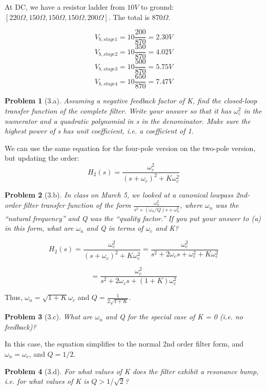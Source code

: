 \documentclass[12pt]{article}
\providecommand{\ohm}[0]{\ensuremath{\Omega}}
\newtheorem*{prob}{Problem}
\begin{document}
At DC, we have a resistor ladder from $10V$ to ground: $[ 220\ohm, 150\ohm, 150\ohm, 150\ohm, 200\ohm ]$. The total is $870\ohm$.

\[ V_{b,stage1} = 10\frac{200}{870} = 2.30V \]
\[ V_{b,stage2} = 10\frac{350}{870} = 4.02V \]
\[ V_{b,stage3} = 10\frac{500}{870} = 5.75V \]
\[ V_{b,stage4} = 10\frac{650}{870} = 7.47V \]


\begin{prob}[3.a]{
Assuming a negative feedback factor of K, find the closed-loop transfer function of the complete filter. Write your answer so that it has $\omega_c^2$ in the numerator and a quadratic polynomial in s in the denominator. Make sure the highest power of s has unit coefficient, i.e. a coefficient of 1.
}\end{prob}
We can use the same equation for the four-pole version on the two-pole version, but updating the order:
\[ H_2(s) = \frac{\omega_c^2}{(s+\omega_c)^2 + K\omega_c^2} \]

\begin{prob}[3.b]{
 In class on March 5, we looked at a canonical lowpass 2nd-order filter transfer function of the form $\frac{\omega_n^2 }{s^2 + (\omega_n / Q) s + \omega_n^2}$, where $\omega_n$ was the ``natural frequency'' and Q was the ``quality factor.'' If you put your answer to (a) in this form, what are $\omega_n$ and Q in terms of $\omega_c$ and K?
}\end{prob}

\[ H_2(s) = \frac{\omega_c^2}{(s+\omega_c)^2 + K\omega_c^2} = \frac{\omega_c^2}{s^2+2\omega_cs + \omega_c^2 + K\omega_c^2} \]

\[ = \frac{\omega_c^2}{s^2+2\omega_cs + (1+K)\omega_c^2} \]

Thus, $\omega_n = \sqrt{1+K}\omega_c$ and $Q= \frac{1}{2\sqrt{1+K}}$.

\begin{prob}[3.c]{
What are $\omega_n$ and Q for the special case of K = 0 (i.e. no feedback)?
}\end{prob}
In this case, the equation simplifies to the normal 2nd order filter form, and $\omega_n=\omega_c$, and $Q=1/2$.

\begin{prob}[3.d]{
For what values of K does the filter exhibit a resonance bump, i.e. for what values of K is $Q > 1/\sqrt{2}$?
}\end{prob}
\end{document}
